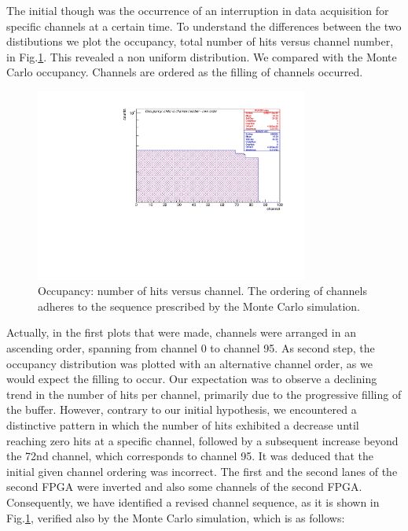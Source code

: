 The initial though  was the occurrence of an interruption in data acquisition for specific channels at a certain time. To understand the differences between the two distibutions we plot the occupancy, total number of hits versus channel number, in Fig.\ref{fig:2}. This revealed a non uniform distribution. We compared with the Monte Carlo occupancy. Channels are ordered as the filling of channels occurred.
\begin{figure}[!h]
\centering
\includegraphics[width =0.8\textwidth]{figures/pdf/figure_00004_nhitsvschannel_roc_simulation_281}
\caption{Occupancy: number of hits versus channel. The ordering of channels adheres to the sequence prescribed by the Monte Carlo simulation.}
\label{fig:2}
\end{figure}
Actually, in the first plots that were made, channels were arranged in an ascending order, spanning from channel 0 to channel 95.
As second step, the occupancy distribution was plotted with an alternative channel order, as we would expect the filling to occur.
Our expectation was to observe a declining trend in the number of hits per channel, primarily due to the progressive filling of the buffer. 
However, contrary to our initial hypothesis, we encountered a distinctive pattern in which the number of hits exhibited a decrease until reaching zero hits at a specific channel, followed by a subsequent increase beyond the 72nd channel, which corresponds to channel 95.
It was deduced that the initial given channel ordering was incorrect. 
The first and the second lanes of the second FPGA were inverted and also some channels of the second FPGA.
Consequently, we have identified a revised channel sequence, as it is shown in Fig.\ref{fig:2}, verified also by the Monte Carlo simulation, which is as follows:
